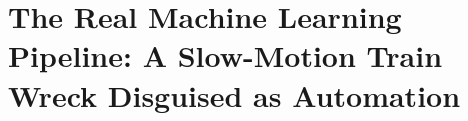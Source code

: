 \part{The Real Machine Learning Pipeline: A Slow-Motion Train Wreck Disguised as Automation}

%
%
%
%
%
%
%
%
%